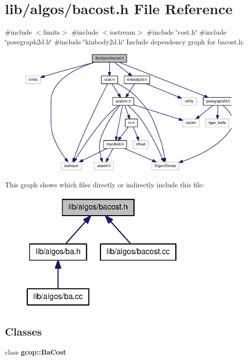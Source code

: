 \section{lib/algos/bacost.h \-File \-Reference}
\label{bacost_8h}
{\ttfamily \#include $<$limits$>$}\*
{\ttfamily \#include $<$iostream$>$}\*
{\ttfamily \#include \char`\"{}cost.\-h\char`\"{}}\*
{\ttfamily \#include \char`\"{}posegraph2d.\-h\char`\"{}}\*
{\ttfamily \#include \char`\"{}kinbody2d.\-h\char`\"{}}\*
\-Include dependency graph for bacost.\-h\-:
\nopagebreak
\begin{figure}[H]
\begin{center}
\leavevmode
\includegraphics[width=350pt]{bacost_8h__incl}
\end{center}
\end{figure}
\-This graph shows which files directly or indirectly include this file\-:
\nopagebreak
\begin{figure}[H]
\begin{center}
\leavevmode
\includegraphics[width=237pt]{bacost_8h__dep__incl}
\end{center}
\end{figure}
\subsection*{\-Classes}
\begin{DoxyCompactItemize}
\item 
class {\bf gcop\-::\-Ba\-Cost}
\end{DoxyCompactItemize}
